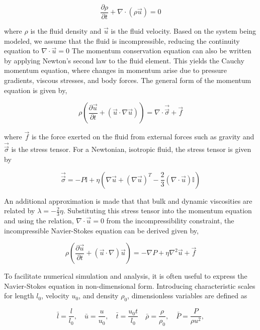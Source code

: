 \begin{equation}
    \frac{\partial\rho}{\partial t} + \nabla\cdot\left(\rho\vec{u}\right) = 0
\end{equation}

where $\rho$ is the fluid density and $\vec{u}$ is the fluid velocity. Based on the system being modeled, we assume that the fluid is incompressible, reducing the continuity equation to
$\nabla\cdot \vec{u} = 0$ The momentum conservation equation can also be written by applying Newton's second law to the fluid element. This yields the Cauchy momentum equation, 
where changes in momentum arise due to pressure gradients, viscous stresses, and body forces. The general form of the momentum equation is given by,

\begin{equation}
    \rho \left( \frac{\partial \vec{u}}{\partial t} + (\vec{u}\cdot \nabla \vec{u})  \right) = \nabla \cdot \vec{\vec{\sigma}} + \vec{f}
\end{equation}

where $\vec{f}$ is the force exerted on the fluid from external forces such as gravity and $\vec{\vec{\sigma}}$ is the stress tensor. 
For a Newtonian, isotropic fluid, the stress tensor is given by

\begin{equation}
    \vec{\vec{\sigma}} = -P\mathbb{I} + \eta\left( \nabla \vec{u} + (\nabla \vec{u})^T - \frac{2}{3}(\nabla \cdot \vec{u})\mathbb{I} \right)
\end{equation}

An additional approximation is made that that bulk and dynamic viscosities are related by $\lambda = -\frac{2}{3} \eta$. Substituting this stress tensor into the momentum equation 
and using the relation, $\nabla\cdot \vec{u} = 0$ from the incompressibility constraint, the incompressible Navier-Stokes equation can be derived given by,

\begin{equation}
    \rho \left(\frac{\partial\vec{u}}{\partial t} + (\vec{u}\cdot\nabla)\vec{u} \right) = -\nabla P + \eta \nabla^2 \vec{u} + \vec{f}
\end{equation}

To facilitate numerical simulation and analysis, it is often useful to express the Navier-Stokes equation in non-dimensional form. Introducing characteristic scales for length 
$l_0$, velocity $u_0$, and density $\rho_0$, dimensionless variables are defined as

\begin{equation}
    \bar{l} = \frac{l}{l_0}, \quad \bar{u} = \frac{u}{u_0}, \quad \bar{t} = \frac{u_0 t}{l_0} \quad \bar{\rho} = \frac{\rho}{\rho_0}, \quad \bar{P} = \frac{P}{\rho u^2}, 
\end{equation}

